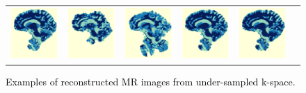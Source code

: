 \documentclass[review]{elsarticle}
\begin{document}
\begin{figure}[H]
\begin{raggedright}
\begin{tabular}{>{\centering}b{0.2cm}lcccc}
 			\includegraphics[width=2.5cm]{include/grp2/factor6/022-Guys-0701-T1/022-Guys-0701-T1_segs__50} &
 			\includegraphics[width=2.5cm]{include/grp2/factor6/022-Guys-0701-T1/022-Guys-0701-T1_segs__zeroPadding_50} & \includegraphics[width=2.5cm]{include/grp2/factor6/022-Guys-0701-T1/022-Guys-0701-T1_segs__CS_50} & \includegraphics[width=2.5cm]{include/grp2/factor6/022-Guys-0701-T1/022-Guys-0701-T1_segs__CNNL2_50} & \includegraphics[width=2.5cm]{include/grp2/factor6/022-Guys-0701-T1/022-Guys-0701-T1_segs__predict_50}
			
			
		\end{tabular}
	\par\end{raggedright}
	\raggedright{}\caption{\textcolor{black}{\footnotesize{}Examples of reconstructed MR images from under-sampled k-space.}}
	\label{fig:example} 
\end{figure}
\end{document}
